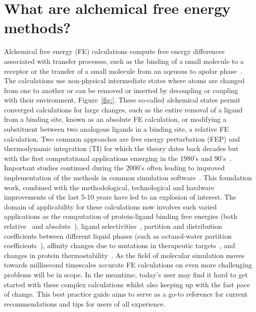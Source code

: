 \documentclass[9pt,bestpractices]{livecoms}
\begin{document}
\section{What are alchemical free energy methods?}
\label{sec:intro}
Alchemical free energy (FE) calculations compute free energy differences associated with transfer processes, such as the binding of a small molecule to a receptor or the transfer of a small molecule from an aqeuous to apolar phase~\cite{zwanzig1954hightemperature}. 
The calculations use non-physical intermediate states where atoms are changed from one to another or can be removed or inserted by decoupling or coupling with their environment, Figure~\ref{fig:}. These so-called alchemical states permit converged calculations for large changes, such as the entire removal of a ligand from a binding site, known as an absolute FE calculation, or modifying a substituent between two analogous ligands in a binding site, a relative FE calculation. Two common approaches are free energy perturbation (FEP) and thermodynamic integration (TI) for which the theory dates back decades but with the first computational applications emerging in the 1980's and 90's~\cite{kirkwood1935statistical, jorgensen1985monte, kollman1993free, wong1986dynamics, merz1989free}. Important studies continued during the 2000's often leading to improved implementation of the methods in common simulation software~\cite{vanderspoel2005gromacs, mermelstein2018fast, wang2015accurate, biosimspace}. This foundation work, combined with the methodological, technological and hardware improvements of the last 5-10 years have led to an explosion of interest.  The domain of applicability for these calculations now involves such varied applications as the computation of protein-ligand binding free energies (both relative~\cite{relative-binding-free-energies} and absolute~\cite{absolute-binding-free-energies}), ligand selectivities~\cite{selectivity}, partition and distribution coefficients between different liquid phases (such as octanol-water partition coefficients~\cite{octanol-water-partition}), affinity changes due to mutations in therapeutic targets~\cite{hauser2018predicting,aldeghi2018accurate}, and changes in protein thermostability~\cite{seeliger2010protein,gapsys2016insights,gapsys2016accurate,aldeghi2019accurate}. As the field of molecular simulation moves towards millisecond timescales accurate FE calculations on even more challenging problems will be in scope. In the meantime, today's user may find it hard to get started with these complex calculations whilst also keeping up with the fast pace of change. This best practice guide aims to serve as a go-to reference for current recommendations and tips for users of all experience.  
\end{document}
